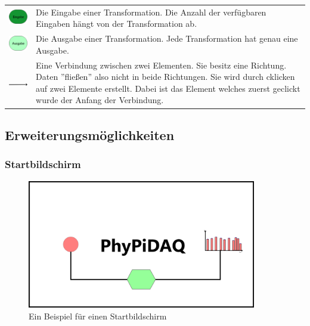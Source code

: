 \documentclass[parskip=full]{scrartcl}
\begin{document}
\begin{tabular}[t]{p{1cm} p{10cm}}
	\vspace{0cm}\includegraphics[width = 1 cm]{Grafik/Eingabe-Verbindung.png} & Die Eingabe einer Transformation. Die Anzahl der verfügbaren Eingaben hängt von der Transformation ab.\newline\\
	\vspace{0cm}\includegraphics[width = 1 cm]{Grafik/Ausgabe-Transformation.png} & Die Ausgabe einer Transformation. Jede Transformation hat genau eine Ausgabe.\newline\\\cline{1-2}
	\vspace{0cm}\includegraphics[width = 1 cm]{Grafik/Verbindungspfeil.png} & Eine Verbindung zwischen zwei Elementen. Sie besitz eine Richtung. Daten ''fließen'' also nicht in beide Richtungen. Sie wird durch cklicken auf zwei Elemente erstellt. Dabei ist das Element welches zuerst geclickt wurde der Anfang der Verbindung.\newline\\
\end{tabular}

\subsection{Erweiterungsmöglichkeiten}

\subsubsection{Startbildschirm}

\begin{figure}[h]
	\begin{center}
		\includegraphics[width = 10cm]{Grafik/Startbildschirm.png}
		\caption{Ein Beispiel für einen Startbildschirm}
		\label{startbildschirm}
	\end{center}
\end{figure}
\end{document}
